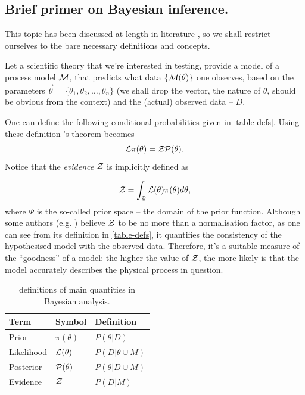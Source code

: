 \documentclass[usenatbib]{mnras}
\begin{document}
\subsection{Brief primer on Bayesian inference.}
\label{sec:orgc817bf9}

This topic has been discussed at length in literature
\citep{jeffreys2010scientific}, so we shall restrict ourselves to the
bare necessary definitions and concepts.

Let a scientific theory that we're interested in testing, provide a
model of a process model \({\cal M}\), that predicts what data \(\lbrace {\cal M}(\vec{\theta})\rbrace\) one observes, based on the
parameters \(\vec{\theta} = \lbrace \theta_1, \theta_2, \ldots,
   \theta_n \rbrace\) (we shall drop the vector, the nature of
\(\theta\), should be obvious from the context) and the (actual)
observed data -- \(D\).

One can define the following conditional probabilities given
in \autoref{table-defs}. Using these definition \citeauthor{1763} 's theorem
becomes
\begin{equation}
 {\cal L} \pi (\theta) = {\cal Z} {\cal P} (\theta).
\label{eq:bayes} 
\end{equation}
Notice that the \emph{evidence} \({\cal Z}\) is implicitly defined as

\begin{equation}\label{eq:def-z}
 {\cal Z} = \int_{\Psi} {\cal L}(\theta) \pi(\theta) d\theta, 
\end{equation}
where \(\Psi\) is the so-called prior space -- the domain of the
prior function. Although some authors
(e.g. \citeauthor{jeffreys2010scientific}) believe \({\cal Z}\) to be
no more than a normalisation factor, as one can see from its
definition in \autoref{table-defs}, it quantifies the consistency of
the hypothesised model with the observed data. Therefore, it's a
suitable measure of the ``goodness'' of a model: the higher the
value of \({\cal Z}\), the more likely is that the model accurately
describes the physical process in question.

\begin{table}[htbp]
\caption{definitions of main quantities in Bayesian analysis. \label{table-defs}}
\centering
\begin{tabular}{lll}
\textbf{\textbf{Term}} & \textbf{\textbf{Symbol}} & \textbf{\textbf{Definition}}\\
\hline
Prior & \(\pi(\theta)\) & \(P ( \theta  \vert D)\)\\
Likelihood & \({\cal L}(\theta)\) & \(P ( D \vert \theta \cup M)\)\\
Posterior & \({\cal P}(\theta)\) & \(P ( \theta \vert D \cup M)\)\\
Evidence & \({\cal Z}\) & \(P ( D \vert M)\)\\
\end{tabular}
\end{table}
\end{document}
